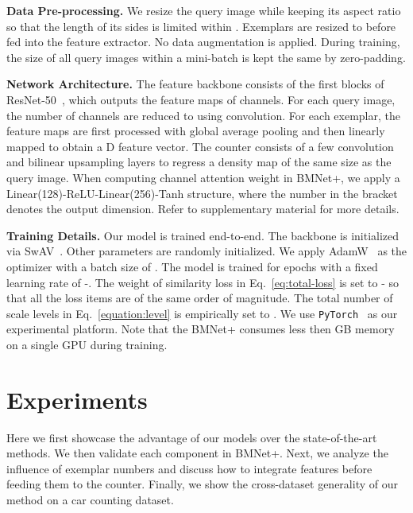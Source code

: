 \documentclass[10pt,twocolumn,letterpaper]{article}
\newcommand{\margin}{\vspace{3pt}\noindent}
\begin{document}
\margin
\textbf{Data Pre-processing.}
We resize the query image while keeping its aspect ratio so that the length of its sides is limited within . Exemplars are resized to  before fed into the feature extractor. No data augmentation is applied. During training, the size of all query images within a mini-batch is kept the same by zero-padding. 

\margin
\textbf{Network Architecture.}
The feature backbone consists of the first  blocks of ResNet-50~\cite{resnet}, which outputs the feature maps of  channels. For each query image, the number of channels are reduced to  using  convolution. For each exemplar, the feature maps are first processed with global average pooling and then linearly mapped to obtain a D feature vector. The counter consists of a few convolution and bilinear upsampling layers to regress a density map of the same size as the query image. When computing channel attention weight  in BMNet+, we apply a Linear(128)-ReLU-Linear(256)-Tanh structure, where the number in the bracket denotes the output dimension. Refer to supplementary material for more details.

\margin
\textbf{Training Details.}
Our model is trained end-to-end. The backbone is initialized via SwAV~\cite{swav}. Other parameters are randomly initialized. We apply AdamW~\cite{adamw} as the optimizer with a batch size of . The model is trained for  epochs with a fixed learning rate of -. The weight  of similarity loss in Eq.~\ref{eq:total-loss} is set to - so that all the loss items are of the same order of magnitude. The total number of scale levels in Eq.~\ref{equation:level} is empirically set to . We use \texttt{PyTorch}~\cite{paszke2019pytorch} as our experimental platform. Note that the BMNet+ consumes less then GB memory on a single GPU during training. 


\section{Experiments}
\label{exp:all}
Here we first showcase the advantage of our models over the state-of-the-art methods. We then validate each component in BMNet+. Next, we analyze the influence of exemplar numbers and discuss how to integrate features before feeding them to the counter. Finally, we show the cross-dataset generality of our method on a car counting dataset.
\end{document}
